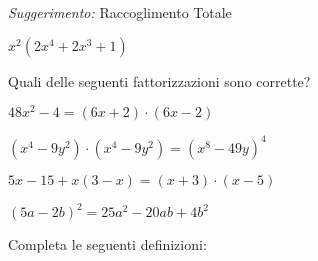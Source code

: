 \documentclass[11pt, a4paper, answers]{exam}
\begin{document}
\begin{questions}
\begin{multicols}{2}
\begin{parts}
{\footnotesize {\emph{Suggerimento:} Raccoglimento Totale}}

\begin{solution}
\(x^2(2x^4 + 2x^3 + 1)  \)
\end{solution}


\end{parts}
\end{multicols}



\addpoints
\question [8] Quali delle seguenti fattorizzazioni sono corrette?

\begin{multicols}{2}
\begin{choices}
\choice
\(48x^2 - 4 = (6x + 2) \cdot (6x - 2)\)
\vspace{0.5\baselineskip}

\choice
\((x^4 - 9y^2) \cdot (x^4 - 9y^2) = (x^8 -49y)^4\)
\vspace{0.5\baselineskip}

\choice
\(5x - 15 + x(3 - x) = (x + 3) \cdot (x - 5)\)
\vspace{0.5\baselineskip}

\CorrectChoice
\((5a - 2b)^2 = 25a^2 - 20ab + 4b^2\)

\end{choices}
\end{multicols}



\addpoints
\question Completa le seguenti definizioni:

\end{questions}
\end{document}
